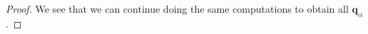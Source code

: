 \documentclass[a4paper]{article}
\begin{document}
\begin{proof}
  We see that we can continue doing the same computations to obtain all $\mathbf{q}_\alpha$.
%
%


\end{proof}

\end{document}
